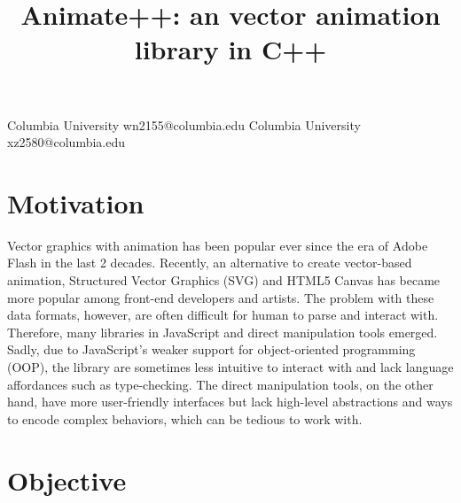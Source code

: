 \documentclass[10pt, nocopyrightspace, numbers]{assets/sigplanconf}
\begin{document}
\title{Animate++: an vector animation library in C++}



           {Columbia University}
           {wn2155@columbia.edu}
           {Columbia University}
           {xz2580@columbia.edu}
\maketitle





\section{Motivation}

Vector graphics with animation has been popular ever since the era of Adobe Flash in the last 2 decades. Recently, an alternative to create vector-based animation,  Structured Vector Graphics (SVG) and HTML5 Canvas has became more popular among front-end developers and artists. The problem with these data formats, however, are often difficult for human to parse and interact with. Therefore, many libraries in JavaScript\cite{paperjs, snapsvg} and direct manipulation tools\cite{svgator} emerged. Sadly, due to JavaScript’s weaker support for object-oriented programming (OOP), the library are sometimes less intuitive to interact with and lack language affordances such as type-checking. The direct manipulation tools, on the other hand, have more user-friendly interfaces but lack high-level abstractions and ways to encode complex behaviors, which can be tedious to work with.

\section{Objective}
\end{document}

